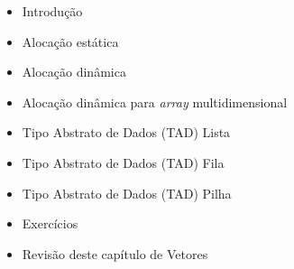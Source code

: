 \documentclass[12pt,a4paper]{article}
\providecommand{\tightlist}{%
      \setlength{\itemsep}{0pt}\setlength{\parskip}{0pt}}
\begin{document}
\begin{itemize}
\tightlist
\item
  Introdução
\item
  Alocação estática
\item
  Alocação dinâmica
\item
  Alocação dinâmica para \emph{array} multidimensional
\item
  Tipo Abstrato de Dados (TAD) Lista
\item
  Tipo Abstrato de Dados (TAD) Fila
\item
  Tipo Abstrato de Dados (TAD) Pilha
\item
  Exercícios
\item
  Revisão deste capítulo de Vetores
\end{itemize}


    
    
    
\end{document}
